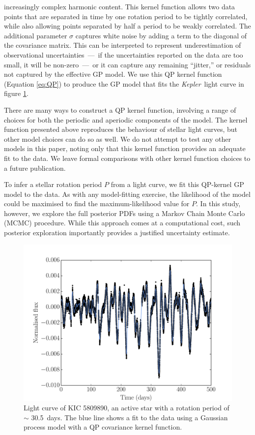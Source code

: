 \documentclass[a4paper,fleqn,usenatbib,useAMS]{mnras}
\newcommand{\Kepler}{{\it Kepler}}
\newcommand{\kepexample}{5809890}
\newcommand{\kepexampleperiod}{30.5}
\begin{document}
increasingly complex harmonic content.
This kernel function allows two data points that are separated in time by one
rotation period to be tightly correlated, while also allowing
points separated by half a period to be weakly correlated.
The additional parameter $\sigma$ captures white noise by adding
a term to the diagonal of the covariance matrix.
This can be interpreted to represent underestimation of observational
uncertainties~---~if the uncertainties reported on the data are too small, it
will be non-zero~---~or it can capture any remaining ``jitter,'' or residuals
not captured by the effective GP model.
We use this QP kernel function (Equation \ref{eq:QP}) to produce
the GP model that fits the \Kepler\ light curve in figure
\ref{fig:GP_example}.

There are many ways to construct a QP kernel function, involving a range of
choices for both the periodic and aperiodic components of the model.
The kernel function presented above reproduces the behaviour of stellar light
curves, but other model choices can do so as well.
We do not attempt to test any other models in this paper, noting only that
this kernel function provides an adequate fit to the data.
We leave formal comparisons with other kernel function choices to a future
publication.

To infer a stellar rotation period $P$ from a light curve, we fit this
QP-kernel GP model to the data.  As with any model-fitting exercise, the
likelihood
of the model could be maximised to find the maximum-likelihood value for $P$.
In this study, however, we explore the full posterior PDFs using a Markov
Chain Monte Carlo (MCMC) procedure.  While
this approach comes at a computational cost, such posterior exploration
importantly provides a justified uncertainty estimate.

\begin{figure}
\begin{center}
\includegraphics[width=\columnwidth, clip=true]{figures/koi_lc_demo.pdf}
\caption[A light curve with a GP model.]
{Light curve of KIC \kepexample, an active star with a rotation period of
$\sim$ \kepexampleperiod\ days.
The blue line shows a fit to the data using a Gaussian process model with a QP
covariance kernel function.}
\label{fig:GP_example}
\end{center}
\end{figure}
\end{document}
